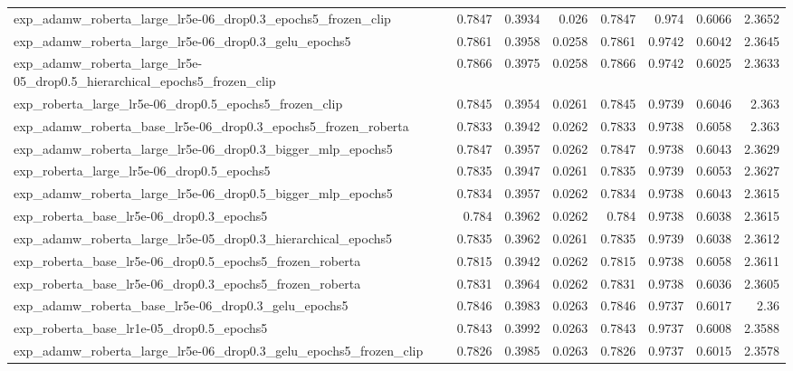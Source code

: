 \documentclass[a4paper,oneside,bibliography=totoc]{scrbook}
\begin{document}
\begin{landscape}
\begin{center}
\begin{longtable}{p{4cm} *{7}{r}}
        exp\_adamw\_roberta\_large\_lr5e-06\_drop0.3\_epochs5\_frozen\_clip & 0.7847 & 0.3934 & 0.026 & 0.7847 & 0.974 & 0.6066 & 2.3652 \\ 
        exp\_adamw\_roberta\_large\_lr5e-06\_drop0.3\_gelu\_epochs5 & 0.7861 & 0.3958 & 0.0258 & 0.7861 & 0.9742 & 0.6042 & 2.3645 \\ 
        exp\_adamw\_roberta\_large\_lr5e-05\_drop0.5\_hierarchical\_epochs5\_frozen\_clip & 0.7866 & 0.3975 & 0.0258 & 0.7866 & 0.9742 & 0.6025 & 2.3633 \\ 
        exp\_roberta\_large\_lr5e-06\_drop0.5\_epochs5\_frozen\_clip & 0.7845 & 0.3954 & 0.0261 & 0.7845 & 0.9739 & 0.6046 & 2.363 \\ 
        exp\_adamw\_roberta\_base\_lr5e-06\_drop0.3\_epochs5\_frozen\_roberta & 0.7833 & 0.3942 & 0.0262 & 0.7833 & 0.9738 & 0.6058 & 2.363 \\ 
        exp\_adamw\_roberta\_large\_lr5e-06\_drop0.3\_bigger\_mlp\_epochs5 & 0.7847 & 0.3957 & 0.0262 & 0.7847 & 0.9738 & 0.6043 & 2.3629 \\ 
        exp\_roberta\_large\_lr5e-06\_drop0.5\_epochs5 & 0.7835 & 0.3947 & 0.0261 & 0.7835 & 0.9739 & 0.6053 & 2.3627 \\ 
        exp\_adamw\_roberta\_large\_lr5e-06\_drop0.5\_bigger\_mlp\_epochs5 & 0.7834 & 0.3957 & 0.0262 & 0.7834 & 0.9738 & 0.6043 & 2.3615 \\ 
        exp\_roberta\_base\_lr5e-06\_drop0.3\_epochs5 & 0.784 & 0.3962 & 0.0262 & 0.784 & 0.9738 & 0.6038 & 2.3615 \\ 
        exp\_adamw\_roberta\_large\_lr5e-05\_drop0.3\_hierarchical\_epochs5 & 0.7835 & 0.3962 & 0.0261 & 0.7835 & 0.9739 & 0.6038 & 2.3612 \\ 
        exp\_roberta\_base\_lr5e-06\_drop0.5\_epochs5\_frozen\_roberta & 0.7815 & 0.3942 & 0.0262 & 0.7815 & 0.9738 & 0.6058 & 2.3611 \\ 
        exp\_roberta\_base\_lr5e-06\_drop0.3\_epochs5\_frozen\_roberta & 0.7831 & 0.3964 & 0.0262 & 0.7831 & 0.9738 & 0.6036 & 2.3605 \\ 
        exp\_adamw\_roberta\_base\_lr5e-06\_drop0.3\_gelu\_epochs5 & 0.7846 & 0.3983 & 0.0263 & 0.7846 & 0.9737 & 0.6017 & 2.36 \\ 
        exp\_roberta\_base\_lr1e-05\_drop0.5\_epochs5 & 0.7843 & 0.3992 & 0.0263 & 0.7843 & 0.9737 & 0.6008 & 2.3588 \\ 
        exp\_adamw\_roberta\_large\_lr5e-06\_drop0.3\_gelu\_epochs5\_frozen\_clip & 0.7826 & 0.3985 & 0.0263 & 0.7826 & 0.9737 & 0.6015 & 2.3578 \\ 

\end{longtable}
\end{center}
\end{landscape}
\end{document}
